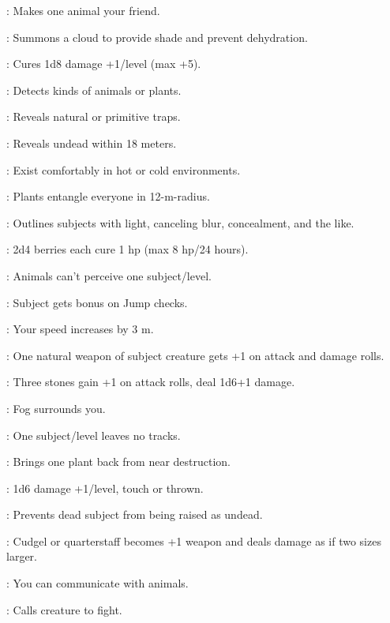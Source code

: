 : Makes one animal your friend.

: Summons a cloud to provide shade and prevent dehydration.

: Cures 1d8 damage +1/level (max +5).

: Detects kinds of animals or plants.

: Reveals natural or primitive traps.

: Reveals undead within 18 meters.

: Exist comfortably in hot or cold environments.

: Plants entangle everyone in 12-m-radius.

: Outlines subjects with light, canceling blur, concealment, and the like.

: 2d4 berries each cure 1 hp (max 8 hp/24 hours).

: Animals can't perceive one subject/level.

: Subject gets bonus on Jump checks.

: Your speed increases by 3 m.

: One natural weapon of subject creature gets +1 on attack and damage rolls.

: Three stones gain +1 on attack rolls, deal 1d6+1 damage.

: Fog surrounds you.

: One subject/level leaves no tracks.

: Brings one plant back from near destruction.

: 1d6 damage +1/level, touch or thrown.

: Prevents dead subject from being raised as undead.

: Cudgel or quarterstaff becomes +1 weapon and deals damage as if two sizes larger.

: You can communicate with animals.

: Calls creature to fight.



